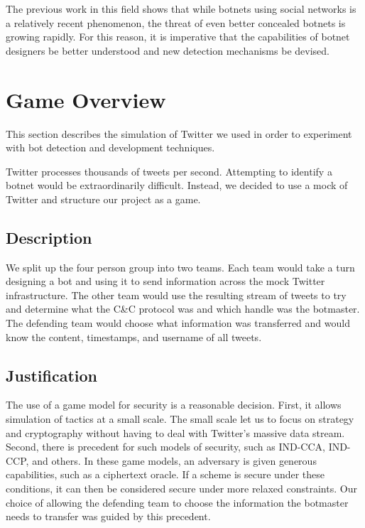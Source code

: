 \documentclass[11pt, oneside]{article} %
\numberwithin{equation}{section} %
\numberwithin{figure}{section} %
\numberwithin{table}{section} %
\begin{document}
The previous work in this field shows that while botnets using social networks is a relatively recent phenomenon, the threat of even better concealed botnets is growing rapidly. For this reason, it is imperative that the capabilities of botnet designers be better understood and new detection mechanisms be devised.

\section{Game Overview}
	This section describes the simulation of Twitter we used in order to experiment with bot detection and development techniques.

Twitter processes thousands of tweets per second. Attempting to identify a botnet would be extraordinarily difficult. Instead, we decided to use a mock of Twitter and structure our project as a game.
	
	\subsection{Description}
		We split up the four person group into two teams. Each team would take a turn designing a bot and using it to send information across the mock Twitter infrastructure. The other team would use the resulting stream of tweets to try and determine what the C\&C protocol was and which handle was the botmaster. The defending team would choose what information was transferred and would know the content, timestamps, and username of all tweets.

	\subsection{Justification}
		The use of a game model for security is a reasonable decision. First, it allows simulation of tactics at a small scale. The small scale let us to focus on strategy and cryptography without having to deal with Twitter's massive data stream. Second, there is precedent for such models of security, such as \textsf{IND-CCA}, \textsf{IND-CCP}, and others. In these game models, an adversary is given generous capabilities, such as a ciphertext oracle. If a scheme is secure under these conditions, it can then be considered secure under more relaxed constraints. Our choice of allowing the defending team to choose the information the botmaster needs to transfer was guided by this precedent.
\end{document}
